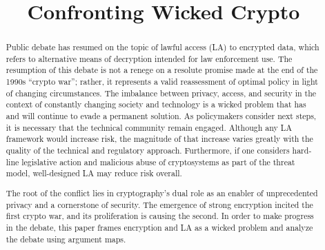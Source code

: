 \documentclass[conference]{IEEEtran}
\begin{document}

\title{Confronting Wicked Crypto}

\author{
\and
}

\maketitle



\begin{abstract}



Public debate has resumed on the topic of lawful access (LA) to encrypted data, which refers to alternative means of
decryption intended for law enforcement use. The resumption of this debate is not a renege on a resolute promise made at
the end of the 1990s ``crypto war''; rather, it represents a valid reassessment of optimal policy in light of changing
circumstances. The imbalance between privacy, access, and security in the context of constantly changing society and
technology is a wicked problem that has and will continue to evade a permanent solution. As policymakers consider next
steps, it is necessary that the technical community remain engaged. Although any LA framework would increase risk, the
magnitude of that increase varies greatly with the quality of the technical and regulatory approach. Furthermore, if one
considers hard-line legislative action and malicious abuse of cryptosystems as part of the threat model, well-designed
LA may reduce risk overall.

The root of the conflict lies in cryptography's dual role as an enabler of unprecedented privacy and a
cornerstone of security. The emergence of strong encryption incited the first crypto war, and its proliferation is
causing the second. In order to make progress in the debate, this paper frames encryption and LA as a wicked problem and
analyze the debate using argument maps.

\end{abstract}
\end{document}
